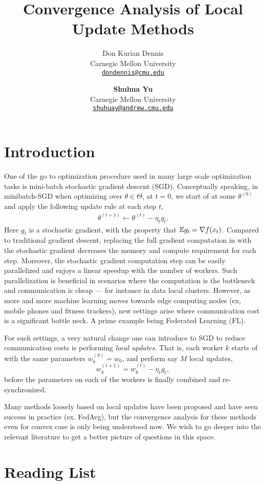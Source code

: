 \documentclass{article}
\title{{Convergence Analysis of Local Update Methods}}
\author{
  Don Kurian Dennis \\ \small Carnegie Mellon University \\ \footnotesize
  \texttt{\href{mailto:dondennis@cmu.edu}{dondennis@cmu.edu}} \and
  \textbf{Shuhua Yu} \\ \small Carnegie Mellon University \\ \footnotesize
  \texttt{\href{mailto:smithv@cmu.edu}{shuhuay@andrew.cmu.edu}}
}
\begin{document}
\maketitle

\section{Introduction}

\vspace*{-1mm}
One of the go to optimization procedure used in many large scale optimization
tasks is mini-batch stochastic gradient descent (SGD). Conceptually speaking,
in minibatch-SGD when optimizing over $\theta \in \Theta$, at $t =
0$, we start of at some $\theta^{(0)}$ and apply the following update rule at
each step $t$,
\begin{align*}
  \theta^{(t+1)} \leftarrow \theta^{(t)} - \eta_t g_t.
\end{align*} Here $g_t$ is a stochastic gradient, with the property that $\mathbb{E}
g_t = \nabla f(x_t)$. Compared to traditional gradient descent, replacing the
full gradient computation in with the stochastic gradient decreases the memory
and compute requirement for each step. Moreover, the stochastic gradient
computation step can be easily parallelized and enjoys a linear speedup with
the number of workers. Such parallelization is beneficial in scenarios where
the computation is the bottleneck and communication is cheap --- for instance
in data local clusters.  However, as more and more machine learning moves
towards edge computing nodes (ex, mobile phones and fitness trackers), new
settings arise where communication cost is a significant bottle neck. A prime
example being Federated Learning (FL).

For such settings, a very natural change one can introduce to SGD to reduce
communication costs is performing \textit{local updates}. That is, each worker
$k$ starts of with the same parameters $w_k^{(0)} = w_0$, and perform say $M$
local updates,
\[
  w_k^{(t+1)} = w_k^{(t)} - \eta_t g_t,
\] before the parameters on each of the workers is finally combined and
re-synchronized.

Many methods loosely based on local updates have been proposed and have seen
success in practice (ex. FedAvg), but the convergence analysis for these
methods even for convex case is only being understood now. We wish to go deeper
into the relevant literature to get a better picture of questions in this
space.

\section{Reading List}
\end{document}
